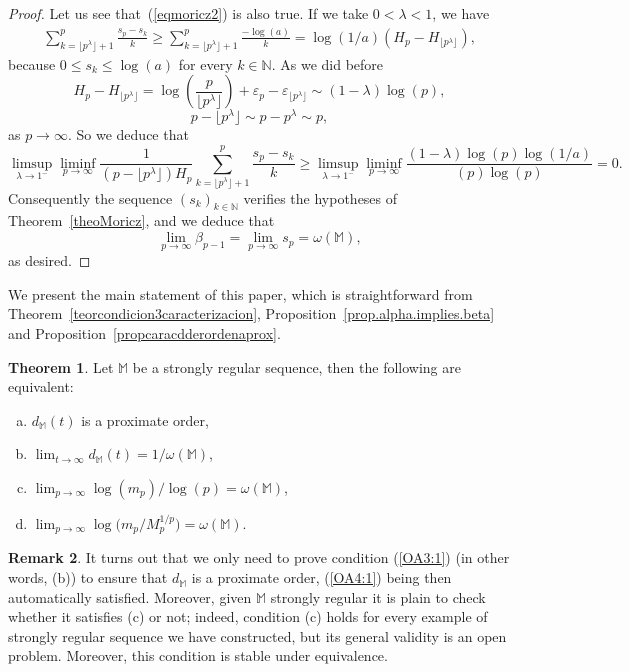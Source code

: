\documentclass[11pt,a4paper]{article}
\theoremstyle{definition}
\newtheorem{theo}{Theorem}[section]
\newtheorem{rema}[theo]{Remark}
\def\oo{\infty}
\def\ri{\rightarrow}
\def\b{\beta}
\def\ep{\varepsilon}
\def\o{\omega}
\def\N{\mathbb{N}}
\def\M{\mathbb{M}}
\def\no{\nonumber}
\begin{document}
\begin{proof}
  Let us see that~(\ref{eqmoricz2}) is also true. If we take $0<\lambda<1$, we have
   \begin{align}
   \sum_{k=\lfloor p^\lambda \rfloor+1}^{p}\frac{s_p-s_k}{k} \geq \sum_{k=\lfloor p^\lambda \rfloor+1}^{p}\frac{-\log(a)}{k} =\log(1/a)(H_{p}-H_{\lfloor p^\lambda\rfloor}) ,\no
  \end{align}
  because $0\leq s_k\leq \log(a)$ for every $k\in\N$. As we did before
  $$H_p-H_{\lfloor p^\lambda\rfloor}=\log\left(\frac{p}{\lfloor p^\lambda \rfloor}\right)+\ep_p-\ep_{\lfloor p^\lambda\rfloor}\sim (1-\lambda)\log(p), $$
 $$p-\lfloor p^\lambda\rfloor\sim p-p^\lambda\sim p, $$
 as $p\ri\oo$. So we deduce that
  $$\limsup_{\lambda\ri1^-}\liminf_{p\ri\oo} \frac{1}{(p-\lfloor p^\lambda\rfloor)H_p}\sum_{k=\lfloor p^\lambda\rfloor+1}^{p}\frac{s_p-s_k}{k}
  \geq \limsup_{\lambda\ri1^-} \liminf_{p\ri\oo} \frac{(1-\lambda)\log(p)\log(1/a)}{(p)\log(p)} =0.$$
 Consequently the sequence $(s_k)_{k\in\N}$ verifies the hypotheses of Theorem~\ref{theoMoricz}, and we deduce that
$$\lim_{p\ri\oo} \b_{p-1}=\lim_{p\ri\oo} s_p =\o(\M),$$
as desired.
\end{proof}



We present the main statement of this paper, which is straightforward from Theorem~\ref{teorcondicion3caracterizacion}, Proposition~\ref{prop.alpha.implies.beta} and Proposition~\ref{propcaracdderordenaprox}.

 \begin{theo}\label{theorem.condition3.implies.beta.converge}
    Let $\M$ be a strongly regular sequence, then the following are equivalent:
\begin{enumerate}[(a)]
 \item $d_{\M}(t)$ is a proximate order,%
 \item $\lim_{t\ri\oo}d_{\M}(t)=1/\o(\M)$,
 \item $\lim_{p\ri\oo} \log(m_p)/\log(p)=\o(\M)$,
 \item  $\lim_{p\ri\oo} \log\big(m_p/M_p^{1/p}\big)=\o(\M)$.
\end{enumerate}
\end{theo}

\begin{rema}
It turns out that we only need to prove condition (\ref{OA3:1}) (in other words, (b)) to ensure that $d_{\M}$ is a proximate order, (\ref{OA4:1}) being then automatically satisfied. Moreover, given $\M$ strongly regular it is plain to check whether it satisfies (c) or not; indeed, condition (c) holds for every example of strongly regular sequence we have constructed, but its general validity is an open problem.  Moreover, this condition is stable under equivalence.
\end{rema}
\end{document}

